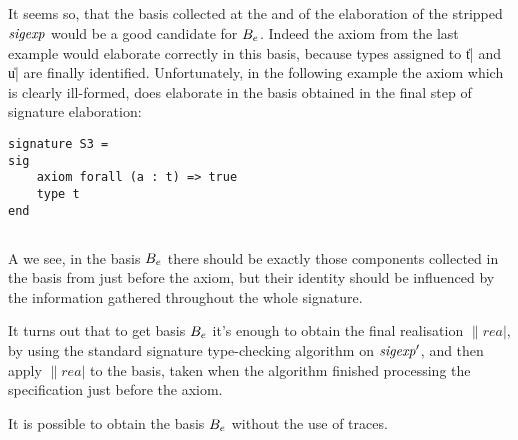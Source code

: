 \subsection{\secomniscient}
\label{sec:omniscient}

It seems so, that the basis collected at the and of the elaboration of
the stripped ${\it sigexp}$ would be a good candidate for $B_e$.
Indeed the axiom from the last example would elaborate correctly in this basis,
because types assigned to \|t| and \|u| are finally identified.
Unfortunately, in the following example the axiom which is clearly ill-formed,
does elaborate in the basis obtained in the final step of signature elaboration:
\begin{verbatim}
signature S3 =
sig
    axiom forall (a : t) => true
    type t
end
\end{verbatim}

\subsection{\secobservation}
\label{sec:observation}

A we see, in the basis $B_e$ there should be exactly those components collected
in the basis from just before the axiom, but their identity should be influenced
by the information gathered throughout the whole signature.

\begin{obs}
It turns out that to get basis $B_e$ it's enough to obtain the final realisation $\|rea|$,
by using the standard signature type-checking algorithm on ${\it sigexp}'$,
and then apply $\|rea|$ to the basis, taken when the algorithm 
finished processing the specification just before the axiom.
\end{obs}

\begin{cor}
It is possible to obtain the basis $B_e$ without the use of traces.
\end{cor}




